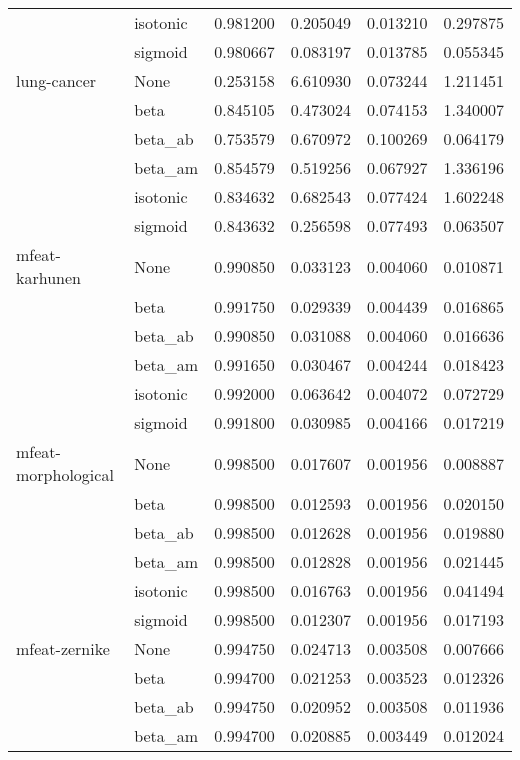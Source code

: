 \begin{tabular}{llrrrr}
        & isotonic &  0.981200 &  0.205049 &  0.013210 &  0.297875 \\
        & sigmoid &  0.980667 &  0.083197 &  0.013785 &  0.055345 \\
lung-cancer & None &  0.253158 &  6.610930 &  0.073244 &  1.211451 \\
        & beta &  0.845105 &  0.473024 &  0.074153 &  1.340007 \\
        & beta\_ab &  0.753579 &  0.670972 &  0.100269 &  0.064179 \\
        & beta\_am &  0.854579 &  0.519256 &  0.067927 &  1.336196 \\
        & isotonic &  0.834632 &  0.682543 &  0.077424 &  1.602248 \\
        & sigmoid &  0.843632 &  0.256598 &  0.077493 &  0.063507 \\
mfeat-karhunen & None &  0.990850 &  0.033123 &  0.004060 &  0.010871 \\
        & beta &  0.991750 &  0.029339 &  0.004439 &  0.016865 \\
        & beta\_ab &  0.990850 &  0.031088 &  0.004060 &  0.016636 \\
        & beta\_am &  0.991650 &  0.030467 &  0.004244 &  0.018423 \\
        & isotonic &  0.992000 &  0.063642 &  0.004072 &  0.072729 \\
        & sigmoid &  0.991800 &  0.030985 &  0.004166 &  0.017219 \\
mfeat-morphological & None &  0.998500 &  0.017607 &  0.001956 &  0.008887 \\
        & beta &  0.998500 &  0.012593 &  0.001956 &  0.020150 \\
        & beta\_ab &  0.998500 &  0.012628 &  0.001956 &  0.019880 \\
        & beta\_am &  0.998500 &  0.012828 &  0.001956 &  0.021445 \\
        & isotonic &  0.998500 &  0.016763 &  0.001956 &  0.041494 \\
        & sigmoid &  0.998500 &  0.012307 &  0.001956 &  0.017193 \\
mfeat-zernike & None &  0.994750 &  0.024713 &  0.003508 &  0.007666 \\
        & beta &  0.994700 &  0.021253 &  0.003523 &  0.012326 \\
        & beta\_ab &  0.994750 &  0.020952 &  0.003508 &  0.011936 \\
        & beta\_am &  0.994700 &  0.020885 &  0.003449 &  0.012024 \\

\end{tabular}
